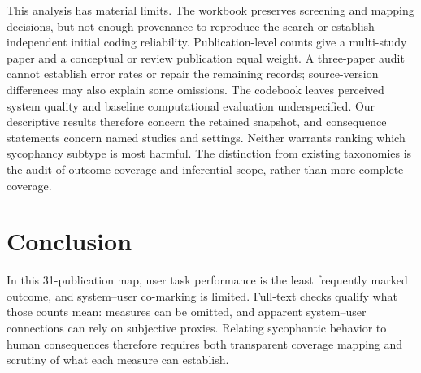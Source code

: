 \documentclass[letterpaper]{article}
\begin{document}
This analysis has material limits. The workbook preserves screening and mapping decisions, but not enough provenance to reproduce the search or establish independent initial coding reliability. Publication-level counts give a multi-study paper and a conceptual or review publication equal weight. A three-paper audit cannot establish error rates or repair the remaining records; source-version differences may also explain some omissions. The codebook leaves perceived system quality and baseline computational evaluation underspecified. Our descriptive results therefore concern the retained snapshot, and consequence statements concern named studies and settings. Neither warrants ranking which sycophancy subtype is most harmful. The distinction from existing taxonomies is the audit of outcome coverage and inferential scope, rather than more complete coverage.

\section{Conclusion}
In this 31-publication map, user task performance is the least frequently marked outcome, and system--user co-marking is limited. Full-text checks qualify what those counts mean: measures can be omitted, and apparent system--user connections can rely on subjective proxies. Relating sycophantic behavior to human consequences therefore requires both transparent coverage mapping and scrutiny of what each measure can establish.


\end{document}
